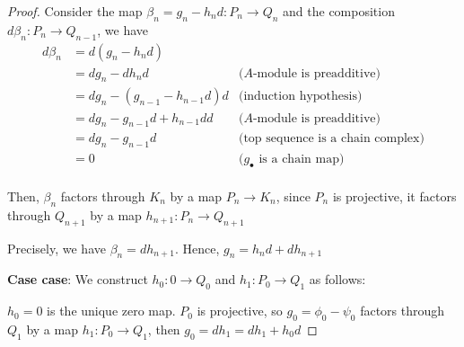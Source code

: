 \begin{proof}
	Consider the map $\beta_n = g_n - h_n d: P_n \to Q_n$ and the composition $d \beta_n: P_n \to Q_{n-1}$, we have
	\begin{align*}
		d \beta_n
		&=d (g_n - h_n d) \\
		&= d g_n - d h_n d &\text{($A$-module is preadditive)}\\
		&= d g_n - (g_{n-1} - h_{n-1} d) d &\text{(induction hypothesis)}\\
		&= d g_n - g_{n-1} d + h_{n-1} d d &\text{($A$-module is preadditive)}\\
		&= d g_n - g_{n-1} d &\text{(top sequence is a chain complex)}\\
		&= 0 &\text{($g_\bullet$ is a chain map)}\\
	\end{align*}
	
	Then, $\beta_n$ factors through $K_n$ by a map $P_n \to K_n$, since $P_n$ is projective, it factors through $Q_{n+1}$ by a map $h_{n+1}: P_n \to Q_{n+1}$
	\begin{center}
	\end{center}
	
	Precisely, we have $\beta_n = d h_{n+1}$. Hence, $g_n = h_n d + d h_{n+1}$
	
	\textbf{Case case}: We construct $h_0: 0 \to Q_0$ and $h_1: P_0 \to Q_1$ as follows:
		
	\begin{center}
	\end{center}
	
	$h_0 = 0$ is the unique zero map. $P_0$ is projective, so $g_0 = \phi_0 - \psi_0$ factors through $Q_1$ by a map $h_1: P_0 \to Q_1$, then $g_0 = d h_1 = d h_1 + h_0 d$
\end{proof}


